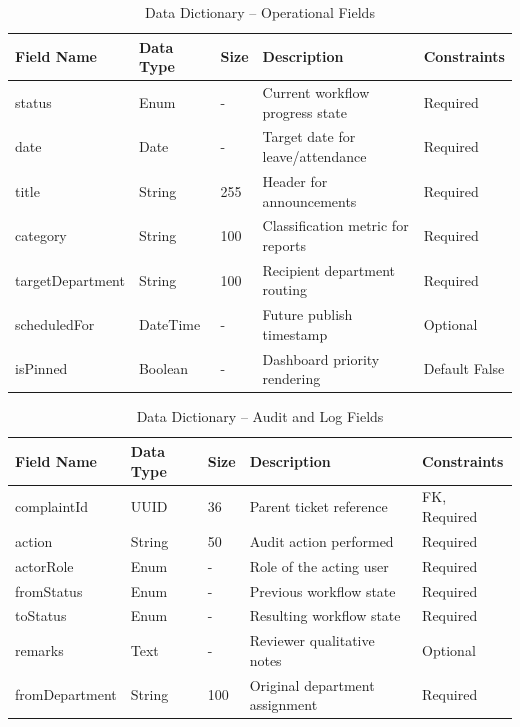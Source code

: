 \begin{table}[H]
\centering
\caption{Data Dictionary – Operational Fields}
\begin{tabularx}{\textwidth}{|p{2.5cm}|p{2cm}|p{1.2cm}|X|p{3cm}|}
\hline
\textbf{Field Name} & \textbf{Data Type} & \textbf{Size} & \textbf{Description} & \textbf{Constraints} \\
\hline
status & Enum & - & Current workflow progress state & Required \\
\hline
date & Date & - & Target date for leave/attendance & Required \\
\hline
title & String & 255 & Header for announcements & Required \\
\hline
category & String & 100 & Classification metric for reports & Required \\
\hline
targetDepartment& String & 100 & Recipient department routing & Required \\
\hline
scheduledFor & DateTime & - & Future publish timestamp & Optional \\
\hline
isPinned & Boolean & - & Dashboard priority rendering & Default False \\
\hline
\end{tabularx}
\end{table}

\begin{table}[H]
\centering
\caption{Data Dictionary – Audit and Log Fields}
\begin{tabularx}{\textwidth}{|p{2.5cm}|p{2cm}|p{1.2cm}|X|p{3cm}|}
\hline
\textbf{Field Name} & \textbf{Data Type} & \textbf{Size} & \textbf{Description} & \textbf{Constraints} \\
\hline
complaintId & UUID & 36 & Parent ticket reference & FK, Required \\
\hline
action & String & 50 & Audit action performed & Required \\
\hline
actorRole & Enum & - & Role of the acting user & Required \\
\hline
fromStatus & Enum & - & Previous workflow state & Required \\
\hline
toStatus & Enum & - & Resulting workflow state & Required \\
\hline
remarks & Text & - & Reviewer qualitative notes & Optional \\
\hline
fromDepartment & String & 100 & Original department assignment& Required \\
\hline
\end{tabularx}
\end{table}


